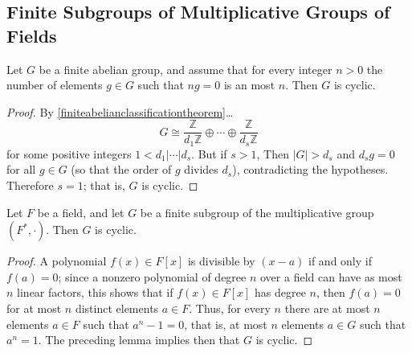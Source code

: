 \subsection{Finite Subgroups of Multiplicative Groups of Fields}\label{subgroupsofmultgrpinfld}

\begin{lemma}
Let $G$ be a finite abelian group, and assume that for every integer $n > 0$ the number of elements $g \in G$ such that $ng = 0$ is an most $n$. Then $G$ is cyclic.
\end{lemma}

\begin{proof}
By \ref{finiteabelianclassificationtheorem}\dots
$$G \cong \frac{\mathbb{Z}}{d_1\mathbb{Z}}\oplus \cdots \oplus \frac{\mathbb{Z}}{d_s\mathbb{Z}}$$
for some positive integers $1 < d_1 | \cdots | d_s$. But if $s > 1$, Then $|G| > d_s$ and $d_sg = 0$ for all $g \in G$ (so that the order of $g$ divides $d_s$), contradicting the hypotheses. Therefore $s = 1$; that is, $G$ is cyclic.
\end{proof}

\begin{proposition}
Let $F$ be a field, and let $G$ be a finite subgroup of the multiplicative group $(F^*, \cdot)$. Then $G$ is cyclic.
\end{proposition}

\begin{proof}
A polynomial $f(x) \in F[x]$ is divisible by $(x-a)$ if and only if $f(a) = 0$; since a nonzero polynomial of degree $n$ over a field can have as most
$n$ linear factors, this shows that if $f(x) \in F[x]$ has degree $n$, then $f(a) = 0$ for at most $n$ distinct elements $a \in F$.
Thus, for every $n$ there are at most $n$ elements $a \in F$ such that $a^n - 1 = 0$, that is, at most $n$ elements $a \in G$ such that $a^n = 1$.
The preceding lemma implies then that $G$ is cyclic.
\end{proof}